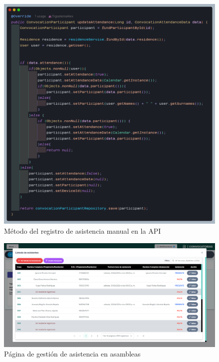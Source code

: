 \begin{figure}[H]
    \centering
    \includegraphics[width=1\textwidth]{resources/images/api-asamblea-asistencia-manual}
    \caption{Método del registro de asistencia manual en la API}
    \label{fig:api-attendance-create}
\end{figure}

\begin{figure}[H]
    \centering
    \includegraphics[width=1\textwidth]{resources/images/sw-asamblea-asistencia}
    \caption{Página de gestión de asistencia en asambleas}
    \label{fig:sw-asamblea-asistencia}
\end{figure}


